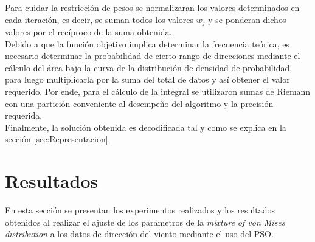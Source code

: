 Para cuidar la restricción de pesos se normalizaran los valores determinados en cada iteración, es decir, se suman todos los valores $w_j$ y se ponderan dichos valores por el recíproco de la suma obtenida.\\
Debido a que la función objetivo implica determinar la frecuencia teórica, es necesario determinar la probabilidad
de cierto rango de direcciones mediante el cálculo del área bajo la curva de la distribución de densidad de probabilidad, para luego multiplicarla por la suma del total de datos y así obtener el valor requerido. Por ende, para el cálculo de la integral se utilizaron sumas de Riemann con una partición conveniente al desempeño del algoritmo y la precisión requerida.\\
Finalmente, la solución obtenida es decodificada tal y como se explica en la sección \ref{sec:Representacion}.\\

\section{Resultados}\label{sec:Resultados_Dir}
En esta sección se presentan los experimentos realizados y los resultados obtenidos al realizar el ajuste de los parámetros de la \emph{mixture of von Mises distribution} a los datos de dirección del viento mediante el uso del PSO.
